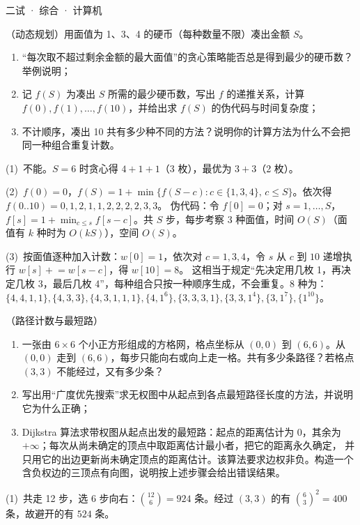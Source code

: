 \documentclass[cjk=noto, seal=first]{mojing-exam}
\begin{document}
\begin{paper}[time={建议 1.5 小时（训练设置）}, full=100]{二试 · 综合 · 计算机}
\begin{questions}
\question[25]
（动态规划）用面值为 1、3、4 的硬币（每种数量不限）凑出金额 $S$。
\begin{enumerate}
  \item “每次取不超过剩余金额的最大面值”的贪心策略能否总是得到最少的硬币数？举例说明；
  \item 记 $f(S)$ 为凑出 $S$ 所需的最少硬币数，写出 $f$ 的递推关系，计算 $f(0),f(1),\dots,f(10)$，并给出求 $f(S)$ 的伪代码与时间复杂度；
  \item 不计顺序，凑出 10 共有多少种不同的方法？说明你的计算方法为什么不会把同一种组合重复计数。
\end{enumerate}
\answerspace{2cm}
\begin{solution}
(1)~不能。$S=6$ 时贪心得 $4+1+1$（3 枚），最优为 $3+3$（2 枚）。

(2)~$f(0)=0$，$f(S)=1+\min\{f(S-c):c\in\{1,3,4\},\,c\le S\}$。依次得
$f(0..10)=0,1,2,1,1,2,2,2,2,3,3$。
伪代码：令 $f[0]=0$；对 $s=1,\dots,S$，$f[s]=1+\min_{c\le s}f[s-c]$。共 $S$ 步，每步考察 3 种面值，时间 $O(S)$（面值有 $k$ 种时为 $O(kS)$），空间 $O(S)$。

(3)~按面值逐种加入计数：$w[0]=1$，依次对 $c=1,3,4$，令 $s$ 从 $c$ 到 $10$ 递增执行 $w[s]\mathrel{+}=w[s-c]$，得 $w[10]=8$。
这相当于规定“先决定用几枚 1，再决定几枚 3，最后几枚 4”，每种组合只按一种顺序生成，不会重复。8 种为：
$\{4,4,1,1\},\{4,3,3\},\{4,3,1,1,1\},\{4,1^6\},\{3,3,3,1\},\{3,3,1^4\},\{3,1^7\},\{1^{10}\}$。
\end{solution}

\question[25]
（路径计数与最短路）
\begin{enumerate}
  \item 一张由 $6\times6$ 个小正方形组成的方格网，格点坐标从 $(0,0)$ 到 $(6,6)$。从 $(0,0)$ 走到 $(6,6)$，每步只能向右或向上走一格。共有多少条路径？若格点 $(3,3)$ 不能经过，又有多少条？
  \item 写出用“广度优先搜索”求无权图中从起点到各点最短路径长度的方法，并说明它为什么正确；
  \item Dijkstra 算法求带权图从起点出发的最短路：起点的距离估计为 0，其余为 $+\infty$；每次从尚未确定的顶点中取距离估计最小者，把它的距离永久确定，
        并只用它的出边更新尚未确定顶点的距离估计。该算法要求边权非负。构造一个含负权边的三顶点有向图，说明按上述步骤会给出错误结果。
\end{enumerate}
\answerspace{2cm}
\begin{solution}
(1)~共走 12 步，选 6 步向右：$\binom{12}6=924$ 条。经过 $(3,3)$ 的有 $\binom63^2=400$ 条，故避开的有 $524$ 条。


\end{solution}
\end{questions}
\end{paper}
\end{document}
